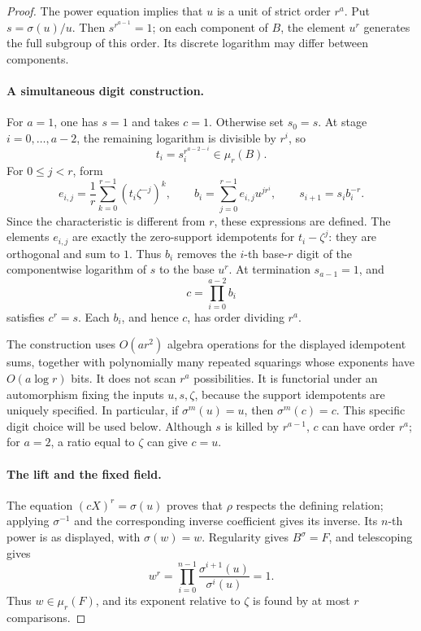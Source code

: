 \documentclass[11pt]{article}
\theoremstyle{definition}
\theoremstyle{remark}
\begin{document}
\begin{proof}
The power equation implies that \(u\) is a unit of strict order \(r^a\).
Put \(s=\sigma(u)/u\).  Then \(s^{r^{a-1}}=1\); on each component
of \(B\), the element \(u^r\) generates the full subgroup of this order.
Its discrete logarithm may differ between components.

\paragraph{A simultaneous digit construction.}
For \(a=1\), one has \(s=1\) and takes \(c=1\).
Otherwise set \(s_0=s\).
At stage \(i=0,\ldots,a-2\), the remaining logarithm is divisible
by \(r^i\), so
\[
                         t_i=s_i^{r^{a-2-i}}\in\mu_r(B).
\]
For \(0\leq j<r\), form
\[
 e_{i,j}=\frac1r\sum_{k=0}^{r-1}(t_i\zeta^{-j})^k,\qquad
 b_i=\sum_{j=0}^{r-1}e_{i,j}u^{jr^i},\qquad
 s_{i+1}=s_i b_i^{-r}.
\]
Since the characteristic is different from \(r\), these expressions
are defined.  The elements \(e_{i,j}\) are exactly the zero-support
idempotents for \(t_i-\zeta^j\): they are orthogonal and sum to \(1\).
Thus \(b_i\) removes the \(i\)-th base-\(r\) digit of the
componentwise logarithm of \(s\) to the base \(u^r\).
At termination \(s_{a-1}=1\), and
\[
                               c=\prod_{i=0}^{a-2}b_i
\]
satisfies \(c^r=s\).  Each \(b_i\), and hence \(c\), has order
dividing \(r^a\).

The construction uses \(O(ar^2)\) algebra operations for the displayed
idempotent sums, together with polynomially many repeated squarings
whose exponents have \(O(a\log r)\) bits.  It does not scan \(r^a\)
possibilities.  It is functorial under an automorphism fixing the
inputs \(u,s,\zeta\), because the support idempotents are uniquely
specified.  In particular, if \(\sigma^m(u)=u\), then
\(\sigma^m(c)=c\).  This specific digit choice will be used below.
Although \(s\) is killed by \(r^{a-1}\), \(c\) can have order \(r^a\);
for \(a=2\), a ratio equal to \(\zeta\) can give \(c=u\).

\paragraph{The lift and the fixed field.}
The equation \((cX)^r=\sigma(u)\) proves that \(\rho\) respects
the defining relation; applying \(\sigma^{-1}\) and the corresponding
inverse coefficient gives its inverse.
Its \(n\)-th power is as displayed, with \(\sigma(w)=w\).
Regularity gives \(B^\sigma=F\), and telescoping gives
\[
                w^r=\prod_{i=0}^{n-1}
                    \frac{\sigma^{i+1}(u)}{\sigma^i(u)}=1.
\]
Thus \(w\in\mu_r(F)\), and its exponent relative to \(\zeta\)
is found by at most \(r\) comparisons.


\end{proof}
\end{document}
